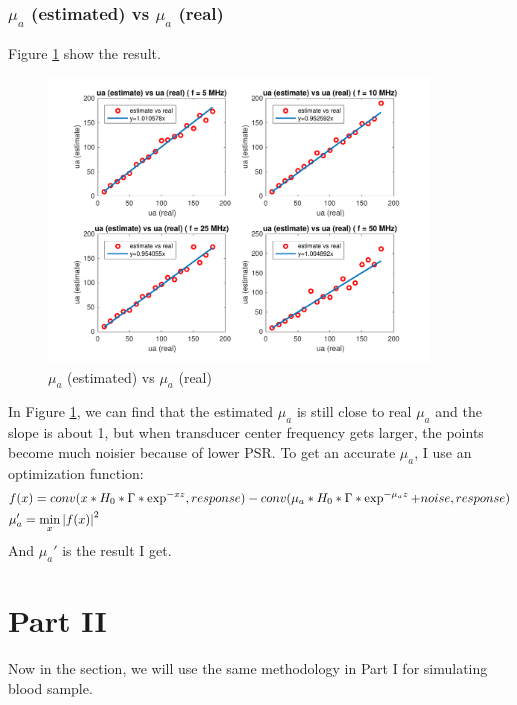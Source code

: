 \documentclass{article}
\DeclarePairedDelimiter\abs{\lvert}{\rvert}%
\begin{document}
\subsubsection{$\mu_a$ (estimated) vs $\mu_a$ (real)}
Figure \ref{fig:p1f-2} show the result.
\begin{figure}[H]
    \centering
    \includegraphics[width=0.9\textwidth]{src/p1f-2.pdf}
    \caption{$\mu_a$ (estimated) vs $\mu_a$ (real)}
    \label{fig:p1f-2}
\end{figure}
In Figure \ref{fig:p1f-2}, we can find that the estimated $\mu_a$ is still close to real $\mu_a$ and the slope is about 1, 
but when transducer center frequency gets larger, the points become much noisier because of lower PSR. To get an accurate 
$\mu_a$, I use an optimization function:
\begin{align}
    & f(x) = conv(x*H_0*\Gamma*\exp^{-xz}, response) - conv(\mu_a*H_0*\Gamma*\exp^{-\mu_az} + noise, response) \\
    & \mu_a' = \min_x{{\abs{f(x)}}^2}
\end{align}
And $\mu_a'$ is the result I get.


\section{Part \RN{2}}
\label{sec:part2}
Now in the section, we will use the same methodology in Part \RN{1} for simulating blood sample.
\end{document}
